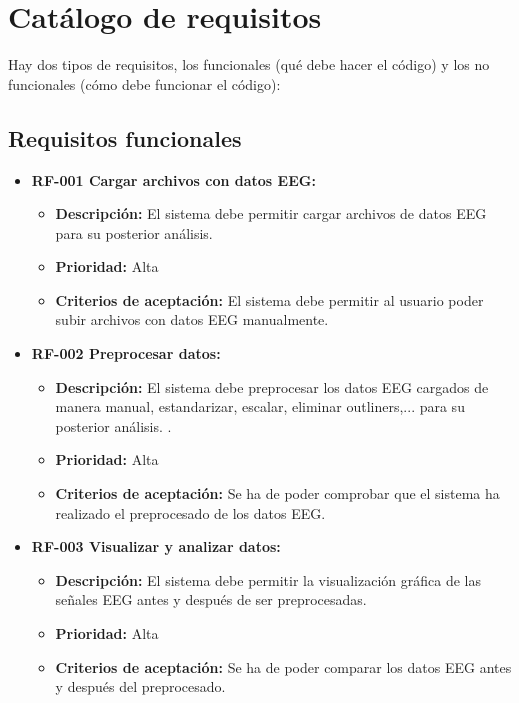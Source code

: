\section{Catálogo de requisitos}

Hay dos tipos de requisitos, los funcionales (qué debe hacer el código) y los no funcionales (cómo debe funcionar el código): 

\subsection{Requisitos funcionales}

\begin{itemize}
\tightlist
\item
  \textbf{RF-001 Cargar archivos con datos EEG:}
 
  \begin{itemize}
  \tightlist
  \item
   \textbf{Descripción:} El sistema debe permitir cargar archivos de datos EEG para su posterior análisis.
  \item
   \textbf{Prioridad:} Alta
  \item
   \textbf{Criterios de aceptación:} El sistema debe permitir al usuario poder subir archivos con datos EEG manualmente. 
  \end{itemize}


\item
  \textbf{RF-002 Preprocesar datos:}
  
  \begin{itemize}
  \tightlist
  \item
    \textbf{Descripción:} El sistema debe preprocesar los datos EEG cargados de manera manual, estandarizar, escalar, eliminar outliners,... para su posterior análisis.
.
  \item
   \textbf{Prioridad:} Alta
  \item
   \textbf{Criterios de aceptación:} Se ha de poder comprobar que el sistema ha realizado el preprocesado de los datos EEG.
  \end{itemize}
 
  
\item
  \textbf{RF-003 Visualizar y analizar datos:}

  \begin{itemize}
  \tightlist
  \item
    \textbf{Descripción:} El sistema debe permitir la visualización gráfica de las señales EEG antes y después de ser preprocesadas.
  \item
    \textbf{Prioridad:} Alta
  \item
    \textbf{Criterios de aceptación:} Se ha de poder comparar los datos EEG antes y después del preprocesado. 
  \end{itemize}



\end{itemize}
